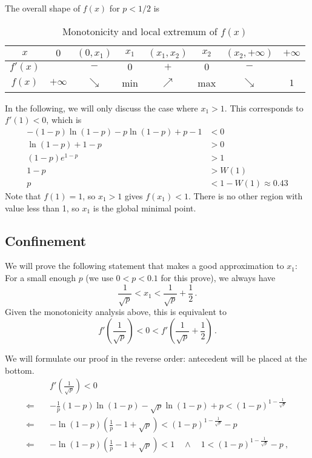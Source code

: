 \documentclass[]{article}
\begin{document}
The overall shape of $f(x)$ for $p < 1/2$ is
\begin{table}[!h]
	\centering
	\caption{Monotonicity and local extremum of $f(x)$}
	\begin{tabular}{c|ccccccc}
		\hline
		$x$&$0$&$(0, x_1)$&$x_1$&$(x_1, x_2)$&$x_2$&$(x_2, +\infty)$&$+\infty$\\
		\hline
		$f'(x)$&&$-$&$0$&$+$&$0$&$-$&\\
		\hline
		$f(x)$&$+\infty$&$\searrow$&min&$\nearrow$&max&$\searrow$&$1$\\
		\hline
	\end{tabular}
	\label{tab:g}
\end{table}

In the following, we will only discuss the case where $x_1 > 1$. This corresponds to $f'(1) < 0$, which is
\begin{align*}
-(1-p)\ln(1-p) - p\ln(1-p) + p - 1  &< 0\\
 \ln(1-p) + 1-p &> 0\\
 (1 - p)e^{1-p} &> 1\\
 1 - p &>W(1)\\
 p &<1-W(1)\approx 0.43
\end{align*}
Note that $f(1) = 1$, so $x_1 > 1$ gives $f(x_1) < 1$. There is no other region with value less than 1, so $x_1$ is the global minimal point.

\subsection{Confinement}
We will prove the following statement that makes a good approximation to $x_1$:\\
For a small enough $p$ (we use $0 < p < 0.1$ for this prove), we always have \[\frac{1}{\sqrt{p}} < x_1 < \frac{1}{\sqrt{p}} + \frac{1}{2}\,.\]
Given the monotonicity analysis above, this is equivalent to\\ \[f'\left(\frac{1}{\sqrt{p}}\right) < 0 < f'\left(\frac{1}{\sqrt{p}} + \frac{1}{2}\right)\,.\]

We will formulate our proof in the reverse order: antecedent will be placed at the bottom.
\begin{align*}
&f'\left(\frac{1}{\sqrt{p}}\right) < 0\\
\Longleftarrow\quad&-\frac{1}{p}(1-p)\ln(1-p) - \sqrt{p}\ln(1-p) + p < (1-p)^{1-\frac{1}{\sqrt{p}}}\\
\Longleftarrow\quad&-\ln(1-p)\left(\frac{1}{p} - 1 + \sqrt{p}\right)< (1-p)^{1-\frac{1}{\sqrt{p}}} - p\\
\Longleftarrow\quad&-\ln(1-p)\left(\frac{1}{p} - 1 + \sqrt{p}\right)< 1\quad\wedge\quad 1 < (1-p)^{1-\frac{1}{\sqrt{p}}} - p\ ,
\end{align*}
\end{document}
